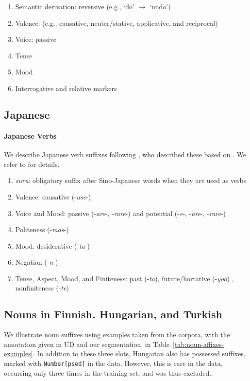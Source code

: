 \documentclass[11pt,letterpaper]{article}
\begin{document}
\begin{enumerate}
\item Semantic derivation: reversive (e.g., `do' $\rightarrow$ `undo')
\item Valence: (e.g., causative, neuter/stative, applicative, and reciprocal)
    \item Voice: passive
    \item Tense
    \item Mood
    \item Interrogative and relative markers
\end{enumerate}

\subsection{Japanese}

\paragraph{Japanese Verbs}
We describe Japanese verb suffixes following \citep{Hahn2020modeling}, who described these based on \citep{kaiser2013japanese,hasegawa2014japanese}.
We refer to \citep{Hahn2020modeling} for details.

\begin{enumerate}
\item \textit{suru}: obligatory suffix after Sino-Japanese words when they are used as verbs
\item Valence: causative (-\textit{ase}-)
\item Voice and Mood: passive (-\textit{are}-, -\textit{rare}-) and potential (-\textit{e}-, -\textit{are}-, -\textit{rare}-)
\item Politeness (-\textit{mas}-)
\item Mood: desiderative (-\textit{ta}-)
\item Negation (-\textit{n}-)
\item Tense, Aspect, Mood, and Finiteness: past (-\textit{ta}), future/hortative (-\textit{yoo}) \citep[229]{kaiser2013japanese}, nonfiniteness (-\textit{te})
\end{enumerate}


\subsection{Nouns in Finnish. Hungarian, and Turkish}

We illustrate noun suffixes using examples taken from the corpora, with the annotation given in UD and our segmentation, in Table~\ref{tab:noun-affixes-examples}.
In addition to these three slots, Hungarian also has possessed suffixes, marked with \texttt{Number[psed]} in the data.
However, this is rare in the data, occurring only three times in the training set, and was thus excluded.
\end{document}
